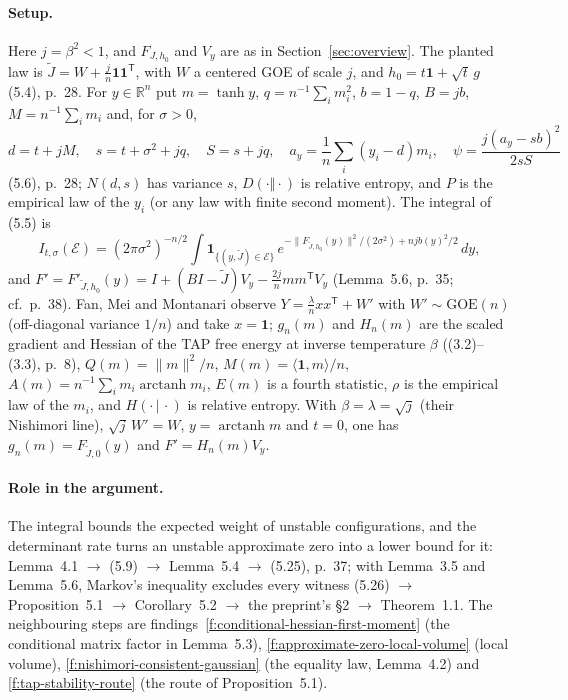\documentclass[11pt]{article}
\newcommand{\R}{\mathbb{R}}
\newcommand{\one}{\mathbf{1}}
\newcommand{\norm}[1]{\lVert #1\rVert}
\newcommand{\ip}[2]{\langle #1,#2\rangle}
\newcommand{\ploc}[2]{#1}
\newcounter{finding}
\begin{document}
\paragraph{Setup.}
Here $j=\beta^2<1$, and $F_{J,h_0}$ and $V_y$ are as in
Section~\ref{sec:overview}. The planted law is
$\tilde J=W+\frac jn\one\one^{\mathsf T}$, with $W$ a centered GOE of scale $j$,
and $h_0=t\one+\sqrt t\,g$ \ploc{(5.4), p.~28}{stability.tex:107--118}. For
$y\in\R^n$ put $m=\tanh y$, $q=n^{-1}\sum_im_i^2$, $b=1-q$, $B=jb$,
$M=n^{-1}\sum_im_i$ and, for $\sigma>0$,
\[
 d=t+jM,\quad s=t+\sigma^2+jq,\quad S=s+jq,\quad
 a_y=\frac1n\sum_i(y_i-d)m_i,\quad \psi=\frac{j(a_y-sb)^2}{2sS}
\]
\ploc{(5.6), p.~28}{stability.tex:136--145}; $N(d,s)$ has variance $s$,
$D(\cdot\Vert\cdot)$ is relative entropy, and $P$ is the empirical law of the
$y_i$ (or any law with finite second moment). The integral of
\ploc{(5.5)}{stability.tex:119--127} is
\[
 I_{t,\sigma}(\mathcal E)=(2\pi\sigma^2)^{-n/2}\int\one_{\{(y,\tilde J)\in\mathcal E\}}\,
 e^{-\norm{F_{\tilde J,h_0}(y)}^2/(2\sigma^2)+njb(y)^2/2}\,dy,
\]
and $F'=F'_{\tilde J,h_0}(y)=I+(BI-\tilde J)V_y-\frac{2j}nmm^{\mathsf T}V_y$
(\ploc{Lemma~5.6, p.~35}{stability.tex:719--720}; cf.\
\ploc{p.~38}{stability.tex:938--945}).
Fan, Mei and Montanari observe $Y=\frac\lambda nxx^{\mathsf T}+W'$ with
$W'\sim\mathrm{GOE}(n)$ (off-diagonal variance $1/n$) and take $x=\one$;
$g_n(m)$ and $H_n(m)$ are the scaled gradient and Hessian of the TAP free
energy at inverse temperature $\beta$ ((3.2)--(3.3), p.~8),
$Q(m)=\norm m^2/n$, $M(m)=\ip{\one}{m}/n$,
$A(m)=n^{-1}\sum_im_i\operatorname{arctanh}m_i$, $E(m)$ is a fourth statistic,
$\rho$ is the empirical law of the $m_i$, and $H(\cdot\,|\,\cdot)$ is relative
entropy. With $\beta=\lambda=\sqrt j$
(their Nishimori line), $\sqrt j\,W'=W$, $y=\operatorname{arctanh}m$ and $t=0$,
one has $g_n(m)=F_{\tilde J,0}(y)$ and $F'=H_n(m)V_y$.

\paragraph{Role in the argument.}
The integral bounds the expected weight of unstable configurations, and the
determinant rate turns an unstable approximate zero into a lower bound for
it: \ploc{Lemma~4.1}{entropy.tex:16--31} $\to$
\ploc{(5.9)}{stability.tex:205--214} $\to$
\ploc{Lemma~5.4}{stability.tex:226--389} $\to$
\ploc{(5.25), p.~37}{stability.tex:891--906}; with
\ploc{Lemma~3.5}{matrices.tex:721--742} and \ploc{Lemma~5.6}{stability.tex:713--832},
Markov's inequality excludes every witness
\ploc{(5.26)}{stability.tex:912--969} $\to$
\ploc{Proposition~5.1}{stability.tex:35--60} $\to$
\ploc{Corollary~5.2}{stability.tex:62--72} $\to$
\ploc{the preprint's \S2}{observation.tex} $\to$
\ploc{Theorem~1.1}{introduction.tex:33--42}. The neighbouring steps are
findings~\ref{f:conditional-hessian-first-moment} (the conditional matrix
factor in \ploc{Lemma~5.3}{stability.tex:157--171}),
\ref{f:approximate-zero-local-volume} (local volume),
\ref{f:nishimori-consistent-gaussian} (the equality law,
\ploc{Lemma~4.2}{entropy.tex:220--243}) and \ref{f:tap-stability-route} (the
route of Proposition~5.1).
\end{document}
